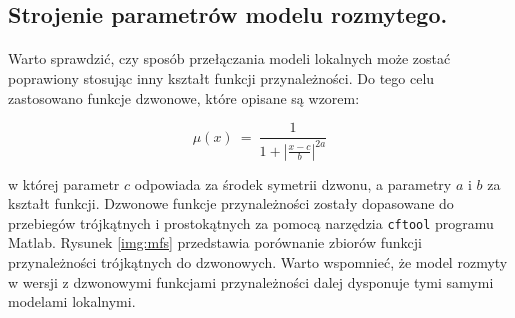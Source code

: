 \documentclass[a4paper,12pt]{article}
\begin{document}
\newpage

\subsection{Strojenie parametrów modelu rozmytego.}
\paragraph{}
Warto sprawdzić, czy sposób przełączania modeli lokalnych może zostać poprawiony stosując inny kształt funkcji przynależności.
Do tego celu zastosowano funkcje dzwonowe, które opisane są wzorem:

\begin{equation}
   \mu(x) ~=~ \frac{1}{1 + \left|\frac{x-c}{b}\right|^{2a}}
\end{equation}

\noindent w której parametr $c$ odpowiada za środek symetrii dzwonu, a parametry $a$ i $b$ za kształt funkcji.
Dzwonowe funkcje przynależności zostały dopasowane do przebiegów trójkątnych i prostokątnych za pomocą narzędzia \texttt{cftool} programu Matlab.
Rysunek \ref{img:mfs} przedstawia porównanie zbiorów funkcji przynależności trójkątnych do dzwonowych.
Warto wspomnieć, że model rozmyty w wersji z dzwonowymi funkcjami przynależności dalej dysponuje tymi samymi modelami lokalnymi.
\end{document}
